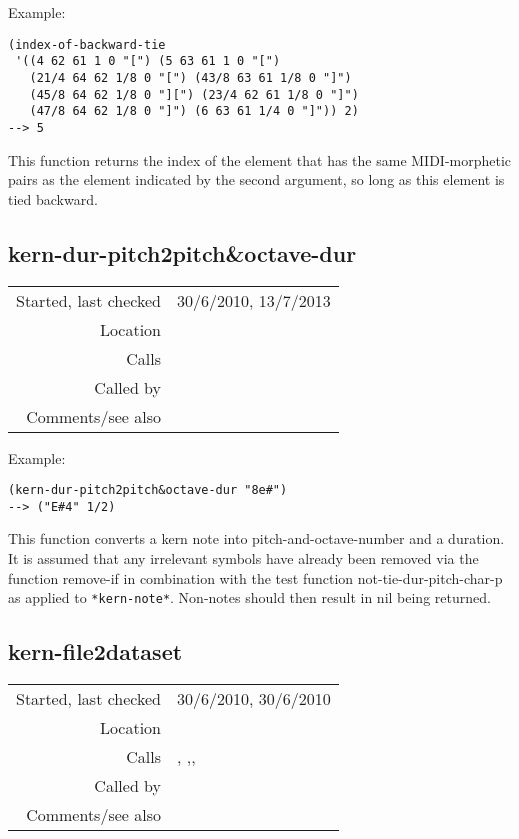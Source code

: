 \vspace{0.5cm}
\noindent Example:
\begin{verbatim}
(index-of-backward-tie
 '((4 62 61 1 0 "[") (5 63 61 1 0 "[")
   (21/4 64 62 1/8 0 "[") (43/8 63 61 1/8 0 "]")
   (45/8 64 62 1/8 0 "][") (23/4 62 61 1/8 0 "]")
   (47/8 64 62 1/8 0 "]") (6 63 61 1/4 0 "]")) 2)
--> 5
\end{verbatim}

\noindent This function returns the index of the
element that has the same MIDI-morphetic pairs as the
element indicated by the second argument, so long as
this element is tied backward.


\subsection*{kern-dur-pitch2pitch\&octave-dur}\label{fun:kern-dur-pitch2pitch-and-octave-dur}

\vspace{0.3cm}
\begin{tabular}{r|p{8cm}}
Started, last checked & 30/6/2010, 13/7/2013 \\
Location & \nameref{sec:kern} \\
Calls & \nameref{fun:kern-pitch-chars2pitch-and-octave} \\
Called by & \nameref{fun:kern-tie-dur-pitch2list} \\
Comments/see also &
\end{tabular}

\vspace{0.5cm}
\noindent Example:
\begin{verbatim}
(kern-dur-pitch2pitch&octave-dur "8e#")
--> ("E#4" 1/2)
\end{verbatim}

\noindent This function converts a kern note into
pitch-and-octave-number and a duration. It is assumed
that any irrelevant symbols have already been removed
via the function remove-if in combination with the
test function not-tie-dur-pitch-char-p as applied to
\texttt{*kern-note*}. Non-notes should then result
in nil being returned.


\subsection*{kern-file2dataset}\label{fun:kern-file2dataset}

\vspace{0.3cm}
\begin{tabular}{r|p{8cm}}
Started, last checked & 30/6/2010, 30/6/2010 \\
Location & \nameref{sec:kern} \\
Calls & \nameref{fun:parse-kern-row}, \nameref{fun:read-from-file-arbitrary},\newline \nameref{fun:resolve-ties-kern}, \nameref{fun:staves-info2staves-variable} \\
Called by & \\
Comments/see also &
\end{tabular}

